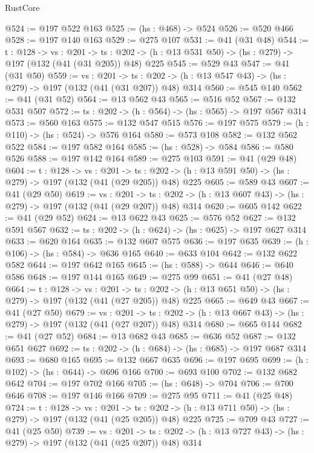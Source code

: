 \begin{lexlean}{RustCore}
\begin{coremodule}
@524 := @197 @522 @163
@525 := (hs : @468) -> @524
@526 := @520 @466
@528 := @197 @140 @163
@529 := @275 @107
@531 := @41 (@31 @48)
@544 := {t : @128} ->
  {vs : @201} ->
  {ts : @202} -> (h : @13 @531 @50) -> (hs : @279) -> @197 (@132 (@41 (@31 @205)) @48) @225
@545 := @529 @43
@547 := @41 (@31 @50)
@559 := {vs : @201} ->
  {ts : @202} -> (h : @13 @547 @43) -> (hs : @279) -> @197 (@132 (@41 (@31 @207)) @48) @314
@560 := @545 @140
@562 := @41 (@31 @52)
@564 := @13 @562 @43
@565 := @516 @52
@567 := @132 @531 @507
@572 := {ts : @202} -> (h : @564) -> (hs : @565) -> @197 @567 @314
@573 := @560 @163
@575 := @132 @547 @515
@576 := @197 @575
@579 := (h : @110) -> (hs : @524) -> @576 @164
@580 := @573 @108
@582 := @132 @562 @522
@584 := @197 @582 @164
@585 := (hs : @528) -> @584
@586 := @580 @526
@588 := @197 @142 @164
@589 := @275 @103
@591 := @41 (@29 @48)
@604 := {t : @128} ->
  {vs : @201} ->
  {ts : @202} -> (h : @13 @591 @50) -> (hs : @279) -> @197 (@132 (@41 (@29 @205)) @48) @225
@605 := @589 @43
@607 := @41 (@29 @50)
@619 := {vs : @201} ->
  {ts : @202} -> (h : @13 @607 @43) -> (hs : @279) -> @197 (@132 (@41 (@29 @207)) @48) @314
@620 := @605 @142
@622 := @41 (@29 @52)
@624 := @13 @622 @43
@625 := @576 @52
@627 := @132 @591 @567
@632 := {ts : @202} -> (h : @624) -> (hs : @625) -> @197 @627 @314
@633 := @620 @164
@635 := @132 @607 @575
@636 := @197 @635
@639 := (h : @106) -> (hs : @584) -> @636 @165
@640 := @633 @104
@642 := @132 @622 @582
@644 := @197 @642 @165
@645 := (hs : @588) -> @644
@646 := @640 @586
@648 := @197 @144 @165
@649 := @275 @99
@651 := @41 (@27 @48)
@664 := {t : @128} ->
  {vs : @201} ->
  {ts : @202} -> (h : @13 @651 @50) -> (hs : @279) -> @197 (@132 (@41 (@27 @205)) @48) @225
@665 := @649 @43
@667 := @41 (@27 @50)
@679 := {vs : @201} ->
  {ts : @202} -> (h : @13 @667 @43) -> (hs : @279) -> @197 (@132 (@41 (@27 @207)) @48) @314
@680 := @665 @144
@682 := @41 (@27 @52)
@684 := @13 @682 @43
@685 := @636 @52
@687 := @132 @651 @627
@692 := {ts : @202} -> (h : @684) -> (hs : @685) -> @197 @687 @314
@693 := @680 @165
@695 := @132 @667 @635
@696 := @197 @695
@699 := (h : @102) -> (hs : @644) -> @696 @166
@700 := @693 @100
@702 := @132 @682 @642
@704 := @197 @702 @166
@705 := (hs : @648) -> @704
@706 := @700 @646
@708 := @197 @146 @166
@709 := @275 @95
@711 := @41 (@25 @48)
@724 := {t : @128} ->
  {vs : @201} ->
  {ts : @202} -> (h : @13 @711 @50) -> (hs : @279) -> @197 (@132 (@41 (@25 @205)) @48) @225
@725 := @709 @43
@727 := @41 (@25 @50)
@739 := {vs : @201} ->
  {ts : @202} -> (h : @13 @727 @43) -> (hs : @279) -> @197 (@132 (@41 (@25 @207)) @48) @314

\end{coremodule}
\end{lexlean}

